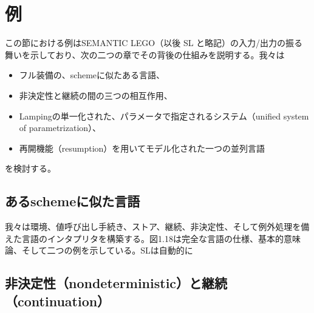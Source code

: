 \documentclass[11pt, oneside]{jsbook}   	%
\begin{document}
\section{例}
この節における例はSEMANTIC LEGO（以後 SL と略記）の入力/出力の振る舞いを示しており、次の二つの章でその背後の仕組みを説明する。我々は
\begin{itemize}
\item フル装備の、schemeに似たある言語、
\item 非決定性と継続の間の三つの相互作用、
\item Lampingの単一化された、パラメータで指定されるシステム（unified system of parametrization）、
\item 再開機能（resumption）を用いてモデル化された一つの並列言語
\end{itemize}
を検討する。

\newpage

\newpage

\newpage

\subsection{あるschemeに似た言語}
我々は環境、値呼び出し手続き、ストア、継続、非決定性、そして例外処理を備えた言語のインタプリタを構築する。図1.18は完全な言語の仕様、基本的意味論、そして二つの例を示している。SLは自動的に
\subsection{非決定性（nondeterministic）と継続（continuation）}










\end{document}
